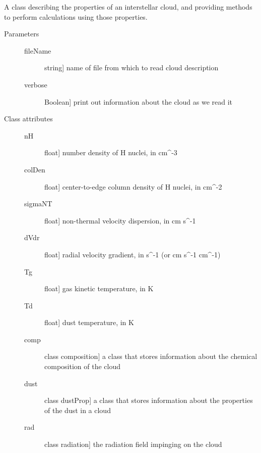 \documentclass[letterpaper,10pt,english]{sphinxmanual}
\begin{document}
\begin{fulllineitems}
\label{fulldoc:despotic.cloud}
A class describing the properties of an interstellar cloud, and
providing methods to perform calculations using those properties.
\begin{description}
\item[{Parameters}] \leavevmode\begin{description}
\item[{fileName}] \leavevmode{[}string{]}
name of file from which to read cloud description

\item[{verbose}] \leavevmode{[}Boolean{]}
print out information about the cloud as we read it

\end{description}

\item[{Class attributes}] \leavevmode\begin{description}
\item[{nH}] \leavevmode{[}float{]}
number density of H nuclei, in cm\textasciicircum{}-3

\item[{colDen}] \leavevmode{[}float{]}
center-to-edge column density of H nuclei, in cm\textasciicircum{}-2

\item[{sigmaNT}] \leavevmode{[}float{]}
non-thermal velocity dispersion, in cm s\textasciicircum{}-1

\item[{dVdr}] \leavevmode{[}float{]}
radial velocity gradient, in s\textasciicircum{}-1 (or cm s\textasciicircum{}-1 cm\textasciicircum{}-1)

\item[{Tg}] \leavevmode{[}float{]}
gas kinetic temperature, in K

\item[{Td}] \leavevmode{[}float{]}
dust temperature, in K

\item[{comp}] \leavevmode{[}class composition{]}
a class that stores information about the chemical
composition of the cloud

\item[{dust}] \leavevmode{[}class dustProp{]}
a class that stores information about the properties of the
dust in a cloud

\item[{rad}] \leavevmode{[}class radiation{]}
the radiation field impinging on the cloud


\end{description}
\end{description}
\end{fulllineitems}
\end{document}
